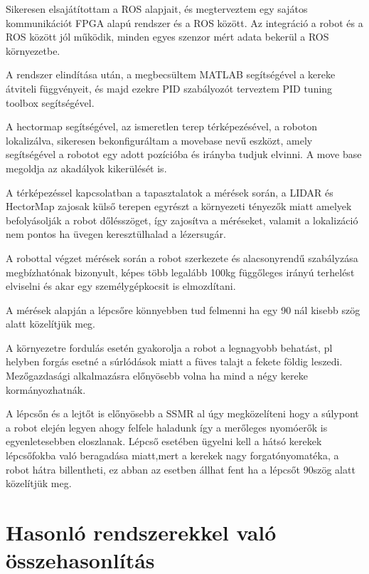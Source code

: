 Sikeresen elsajátítottam a ROS alapjait, és megterveztem egy sajátos kommunikációt FPGA alapú rendszer és a ROS között. Az integráció a robot és a ROS között jól működik, minden egyes szenzor mért adata bekerül a ROS környezetbe.

A rendszer elindítása után, a megbecsültem MATLAB segítségével a kereke átviteli függvényeit, és majd ezekre PID szabályozót terveztem PID tuning toolbox segítségével.

A hectormap segítségével, az ismeretlen terep térképezésével, a roboton lokalizálva, sikeresen bekonfiguráltam a movebase nevű eszközt, amely segítségével a robotot egy adott pozícióba és irányba tudjuk elvinni. A move base megoldja az akadályok kikerülését is.

A térképezéssel kapcsolatban a tapasztalatok a mérések során, a LIDAR és HectorMap zajosak külső terepen egyrészt a környezeti tényezők miatt amelyek befolyásolják a robot dőlésszöget, így zajosítva a méréseket, valamit a lokalizáció nem pontos ha üvegen keresztülhalad a lézersugár.

A robottal végzet mérések során a robot szerkezete és alacsonyrendű szabályzása megbízhatónak bizonyult, képes több legalább 100kg függőleges irányú terhelést elviselni és akar egy személygépkocsit is elmozdítani.

A mérések alapján a lépcsőre könnyebben tud felmenni ha egy 90 \degree nál kisebb szög alatt közelítjük meg.

A környezetre fordulás esetén gyakorolja a robot a legnagyobb behatást, pl helyben forgás esetné a súrlódások miatt a füves talajt a fekete földig leszedi. Mezőgazdasági alkalmazásra előnyösebb volna ha mind a négy kereke kormányozhatnák.

A lépcsőn és a lejtőt is előnyösebb a SSMR al úgy megközelíteni hogy a súlypont a robot elején legyen ahogy felfele haladunk így a merőleges nyomóerők is egyenletesebben eloszlanak. Lépcső esetében ügyelni kell a hátsó kerekek lépcsőfokba való beragadása miatt,mert a kerekek nagy forgatónyomatéka, a robot hátra billentheti, ez abban az esetben állhat fent ha a lépcsőt 90\degree szög alatt közelítjük meg.


\section{Hasonló rendszerekkel való összehasonlítás}

